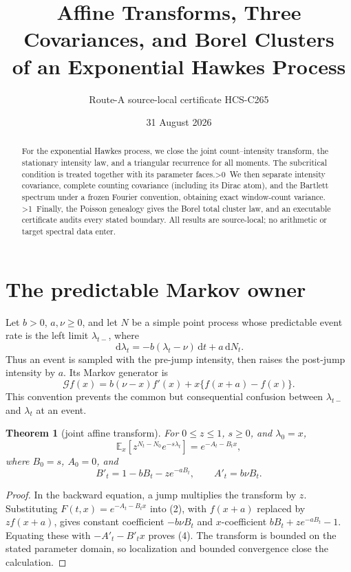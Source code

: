 \documentclass[10pt]{article}
\title{Affine Transforms, Three Covariances, and Borel Clusters\\of an Exponential Hawkes Process}
\author{Route-A source-local certificate HCS-C265}
\date{31 August 2026}
\newtheorem{theorem}{Theorem}
\newcommand{\E}{\mathbb E}
\newcommand{\dd}{\,\mathrm d}
\begin{document}
\maketitle
\begin{abstract}
For the exponential Hawkes process, we close the joint count--intensity
transform, the stationary intensity law, and a triangular recurrence for all
moments.  The subcritical condition is treated together with its parameter
faces.\ifnum\HAWKESROUND>0\ We then separate intensity covariance, complete
counting covariance (including its Dirac atom), and the Bartlett spectrum
under a frozen Fourier convention, obtaining exact window-count variance.\fi
\ifnum\HAWKESROUND>1\ Finally, the Poisson genealogy gives the Borel total
cluster law, and an executable certificate audits every stated boundary.\fi\space
All results are source-local; no arithmetic or target spectral data enter.
\end{abstract}

\section{The predictable Markov owner}
Let $b>0$, $a,\nu\geq0$, and let $N$ be a simple point process whose
predictable event rate is the left limit $\lambda_{t-}$, where
\begin{equation}
 \dd\lambda_t=-b(\lambda_t-\nu)\dd t+a\dd N_t.       \tag{1}
\end{equation}
Thus an event is sampled with the pre-jump intensity, then raises the
post-jump intensity by $a$.  Its Markov generator is
\begin{equation}
 \mathcal Gf(x)=b(\nu-x)f'(x)+x\{f(x+a)-f(x)\}.       \tag{2}
\end{equation}
This convention prevents the common but consequential confusion between
$\lambda_{t-}$ and $\lambda_t$ at an event.

\begin{theorem}[joint affine transform]
For $0\leq z\leq1$, $s\geq0$, and $\lambda_0=x$,
\begin{equation}
 \E_x\!\left[z^{N_t-N_0}e^{-s\lambda_t}\right]
   =e^{-A_t-B_tx},                                    \tag{3}
\end{equation}
where $B_0=s$, $A_0=0$, and
\begin{equation}
 B'_t=1-bB_t-ze^{-aB_t},\qquad A'_t=b\nu B_t.         \tag{4}
\end{equation}
\end{theorem}
\begin{proof}
In the backward equation, a jump multiplies the transform by $z$.  Substituting
$F(t,x)=e^{-A_t-B_tx}$ into (2), with $f(x+a)$ replaced by $zf(x+a)$,
gives constant coefficient $-b\nu B_t$ and $x$-coefficient
$bB_t+ze^{-aB_t}-1$.  Equating these with
$-A'_t-B'_tx$ proves (4).  The transform is bounded on the stated parameter
domain, so localization and bounded convergence close the calculation.
\end{proof}
\end{document}
